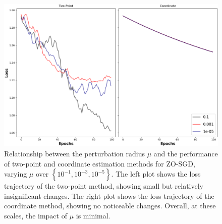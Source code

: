 \begin{figure}[H]
    \centering
    \includegraphics[width=\linewidth]{assets/plot_3.png}
    \caption{Relationship between the perturbation radius $\mu$ and the performance of two-point and coordinate estimation methods for ZO-SGD, varying $\mu$ over $\left\{10^{-1}, 10^{-3}, 10^{-5}\right\}$. The left plot shows the loss trajectory of the two-point method, showing small but relatively insignificant changes. The right plot shows the loss trajectory of the coordinate method, showing no noticeable changes. Overall, at these scales, the impact of $\mu$ is minimal.}
    \label{fig:plot_3}
\end{figure}